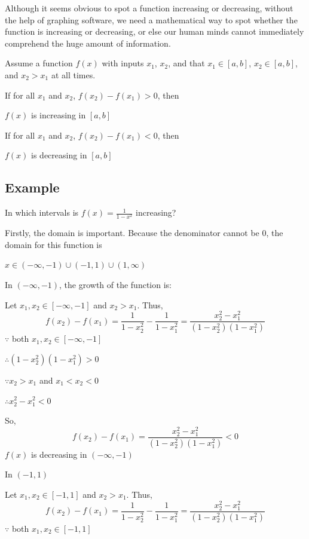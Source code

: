 Although it seems obvious to spot a function increasing or decreasing, without the help of
graphing software, we need a mathematical way to spot whether the function is increasing
or decreasing, or else our human minds cannot immediately comprehend the huge amount of
information.

Assume a function $f(x)$ with inputs $x_1$, $x_2$, and that $x_1 \in [a,b]$, $x_2 \in [a,b]$, and $x_2 > x_1$ at all times.

If for all $x_1$ and $x_2$, $f(x_2) - f(x_1) > 0$, then

$f(x)$ is increasing in $[a,b]$

If for all $x_1$ and $x_2$, $f(x_2) - f(x_1) < 0$, then

$f(x)$ is decreasing in $[a,b]$

\subsection{Example}
\label{sss:exam-1a79}

In which intervals is $f(x) = \frac{1}{1 - x^2}$ increasing?

Firstly, the domain is important. Because the denominator cannot be 0, the domain for this
function is

$x \in (-\infty, -1) \cup (-1, 1) \cup (1, \infty)$

In $(-\infty, -1)$, the growth of the function is:

Let $x_1, x_2 \in [-\infty, -1]$ and $x_2 > x_1$. Thus,
\[
f(x_2) - f(x_1) = \frac{1}{1 - x_2^2} - \frac{1}{1 - x_1^2} = \frac{x_2^2 - x_1^2}{(1 - x_2^2)(1 - x_1^2)}
\]
$\because$ both $x_1, x_2 \in [-\infty, -1]$

$\therefore (1 - x_2^2)(1 - x_1^2) > 0$

$\because x_2 > x_1$ and $x_1 < x_2 < 0$

$\therefore x_2^2 - x_1^2 < 0$

So,
\[
f(x_2) - f(x_1) = \frac{x_2^2 - x_1^2}{(1 - x_2^2)(1 - x_1^2)} < 0
\]
$f(x)$ is decreasing in $(-\infty, -1)$

In $(-1, 1)$

Let $x_1, x_2 \in [-1, 1]$ and $x_2 > x_1$. Thus,
\[
f(x_2) - f(x_1) = \frac{1}{1 - x_2^2} - \frac{1}{1 - x_1^2} = \frac{x_2^2 - x_1^2}{(1 - x_2^2)(1 - x_1^2)}
\]
$\because$ both $x_1, x_2 \in [-1, 1]$

